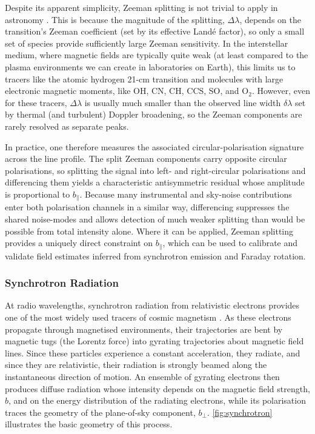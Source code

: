 \documentclass[12pt,twoside]{extreport}
\newcommand{\eg}{e.g.,\xspace} %
\begin{document}
Despite its apparent simplicity, Zeeman splitting is not trivial to apply in astronomy \citep[see details by \eg][]{brauer2017magnetic}. This is because the magnitude of the splitting, $\Delta \lambda$, depends on the transition's Zeeman coefficient (set by its effective Land\'e factor), so only a small set of species provide sufficiently large Zeeman sensitivity. In the interstellar medium, where magnetic fields are typically quite weak (at least compared to the plasma environments we can create in laboratories on Earth), this limits us to tracers like the atomic hydrogen 21-cm transition and molecules with large electronic magnetic moments, like OH, CN, CH, CCS, SO, and O$_2$. However, even for these tracers, $\Delta \lambda$ is usually much smaller than the observed line width $\delta \lambda$ set by thermal (and turbulent) Doppler broadening, so the Zeeman components are rarely resolved as separate peaks.

In practice, one therefore measures the associated circular-polarisation signature across the line profile. The split Zeeman components carry opposite circular polarisations, so splitting the signal into left- and right-circular polarisations and differencing them yields a characteristic antisymmetric residual whose amplitude is proportional to $b_\parallel$. Because many instrumental and sky-noise contributions enter both polarisation channels in a similar way, differencing suppresses the shared noise-modes and allows detection of much weaker splitting than would be possible from total intensity alone. Where it can be applied, Zeeman splitting provides a uniquely direct constraint on $b_\parallel$, which can be used to calibrate and validate field estimates inferred from synchrotron emission and Faraday rotation.

\subsubsection{Synchrotron Radiation}
\label{sec:how-we-see:synchrotron}

At radio wavelengths, synchrotron radiation from relativistic electrons provides one of the most widely used tracers of cosmic magnetism \citep{vallee2011magnetic}. As these electrons propagate through magnetised environments, their trajectories are bent by magnetic tugs (the Lorentz force) into gyrating trajectories about magnetic field lines. Since these particles experience a constant acceleration, they radiate, and since they are relativistic, their radiation is strongly beamed along the instantaneous direction of motion. An ensemble of gyrating electrons then produces diffuse radiation whose intensity depends on the magnetic field strength, $b$, and on the energy distribution of the radiating electrons, while its polarisation traces the geometry of the plane-of-sky component, $b_\perp$. \autoref{fig:synchrotron} illustrates the basic geometry of this process.
\end{document}

